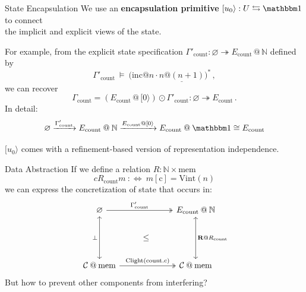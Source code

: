 \documentclass[aspectratio=1610,mathserif]{beamer}
\newcommand{\kw}[1]{\ensuremath{ \mathrm{#1} }}
\begin{document}
\begin{frame}{State Encapsulation}
  We use an \textbf{encapsulation primitive}
  $[u_0 \rangle : U \leftrightarrows \mathbbm1$
  to connect \\ the implicit and explicit views of the state.

  \pause\vfill
  For example, from the explicit state specification
  $\Gamma'_\kw{count} : \varnothing \twoheadrightarrow E_\kw{count} \mathbin@ \mathbb{N}$
  defined by
  \[
    \Gamma'_\kw{count} \: \vDash \: \bigl( \kw{inc}@n \cdot \underline{n@(n+1)} \bigr)^*
   \,,
  \]
  we can recover
  \[
    \Gamma_\kw{count} = (E_\kw{count} \mathbin@ [0 \rangle) \odot \Gamma'_\kw{count}
       : \varnothing \twoheadrightarrow E_\kw{count}
   \,.
  \]
  \pause
  In detail:
  \[
    \varnothing
    \xrightarrow{\Gamma'_\kw{count}}
    E_\kw{count} \mathbin@ \mathbb{N}
    \xrightarrow{E_\kw{count} \mathbin@ [0\rangle}
     E_\kw{count} \mathbin@ \mathbbm1
    \cong
     E_\kw{count}
  \]

  \pause \vfill
  $[u_0\rangle$
  comes with a refinement-based version of representation independence.
\end{frame}

\begin{frame}[fragile]{Data Abstraction}
  If we define a relation $R : \mathbb{N} \times \kw{mem}$
  \[
    c \mathrel{R_\kw{count}} m \: :\Leftrightarrow \:
       m[\kw{c}] = \kw{Vint}(n)
  \]
  we can express the concretization of state that occurs in:
  \[
    \begin{tikzcd}
      \varnothing \ar[rr, twoheadrightarrow, "\Gamma'_\kw{count}"]
        \ar[dd, leftrightarrow, "\bot"'] &&
      E_\kw{count} \mathbin@ \mathbb{N}
      \ar[dd, leftrightarrow, "\mathbf{R} \mathbin@ R_\kw{count}"] \\
      & \le & \\
      \mathcal{C} \mathbin@ \kw{mem} \ar[rr, twoheadrightarrow, "\kw{Clight}(\kw{count.c})"] &&
      \mathcal{C} \mathbin@ \kw{mem}
    \end{tikzcd}
  \]
  \pause\vfill
  But how to prevent other components from interfering?
\end{frame}
\end{document}
